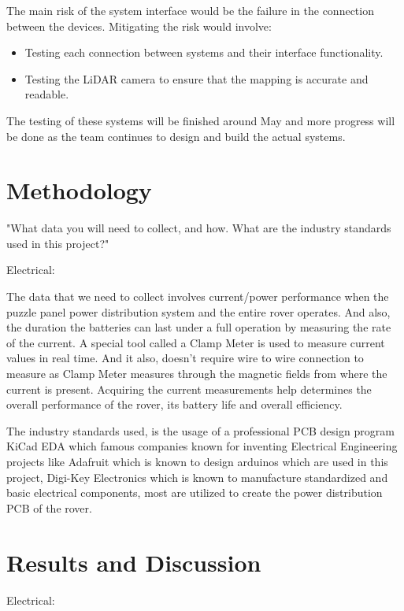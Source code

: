 \documentclass[a4paper, 10pt]{article}
\begin{document}
The main risk of the system interface would be the failure in the connection between the devices. Mitigating the risk would involve:

\begin{itemize}
\item
Testing each connection between systems and their interface functionality.

\item
Testing the LiDAR camera to ensure that the mapping is accurate and readable. 
\end{itemize}

The testing of these systems will be finished around May and more progress will be done as the team continues to design and build the actual systems.

\section{Methodology}

"What data you will need to collect, and how. 
What are the industry standards used in this project?" 

Electrical:

The data that we need to collect involves current/power performance when the puzzle panel power distribution system and the entire rover operates. And also, the duration the batteries can last under a full operation by measuring the rate of the current. A special tool called a Clamp Meter is used to measure current values in real time. And it also, doesn't require wire to wire connection to measure as Clamp Meter measures through the magnetic fields from where the current is present. Acquiring the current measurements help determines the overall performance of the rover, its battery life and overall efficiency.

The industry standards used, is the usage of a professional PCB design program KiCad EDA which famous companies known for inventing Electrical Engineering projects like Adafruit which is known to design arduinos which are used in this project, Digi-Key Electronics which is known to manufacture standardized and basic electrical components, most are utilized to create the power distribution PCB of the rover.

\section{Results and Discussion}

Electrical:
\end{document}
